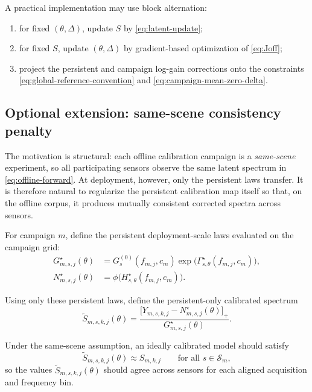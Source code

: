 A practical implementation may use block alternation:

\begin{enumerate}
    \item for fixed $(\theta,\Delta)$, update $S$ by
    \eqref{eq:latent-update};
    \item for fixed $S$, update $(\theta,\Delta)$ by gradient-based
    optimization of \eqref{eq:Joff};
    \item project the persistent and campaign log-gain corrections onto the
    constraints \eqref{eq:global-reference-convention} and
    \eqref{eq:campaign-mean-zero-delta}.
\end{enumerate}

\subsection{Optional extension: same-scene consistency penalty}

The motivation is structural: each offline calibration campaign is a
\emph{same-scene} experiment, so all participating sensors observe the same
latent spectrum in \eqref{eq:offline-forward}. At deployment, however, only
the persistent laws transfer. It is therefore natural to regularize the
persistent calibration map itself so that, on the offline corpus, it produces
mutually consistent corrected spectra across sensors.

For campaign $m$, define the persistent deployment-scale laws evaluated on the
campaign grid:
\begin{align}
G_{m,s,j}^\star(\theta)
&=
G_s^{(0)}(f_{m,j},c_m)
\exp\!\bigl(\Gamma_{s,\theta}^\star(f_{m,j},c_m)\bigr),
\label{eq:consistency-persistent-gain}
\\
N_{m,s,j}^\star(\theta)
&=
\phi\!\bigl(H_{s,\theta}^\star(f_{m,j},c_m)\bigr).
\label{eq:consistency-persistent-floor}
\end{align}

Using only these persistent laws, define the persistent-only calibrated
spectrum
\begin{equation}
\widetilde S_{m,s,k,j}(\theta)
=
\frac{
\bigl[
Y_{m,s,k,j}
-
N_{m,s,j}^\star(\theta)
\bigr]_+
}{
G_{m,s,j}^\star(\theta)
}.
\label{eq:consistency-calibrated-spectrum}
\end{equation}

Under the same-scene assumption, an ideally calibrated model should satisfy
\[
\widetilde S_{m,s,k,j}(\theta)\approx S_{m,k,j}
\qquad
\text{for all }s\in\mathcal S_m,
\]
so the values
\(
\widetilde S_{m,s,k,j}(\theta)
\)
should agree across sensors for each aligned acquisition and frequency bin.

